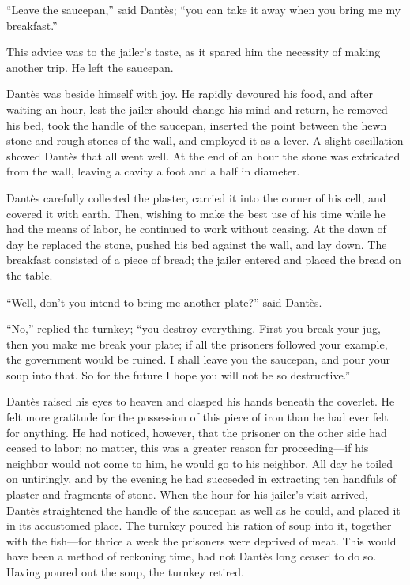“Leave the saucepan,” said Dantès; “you can take it away when you bring
me my breakfast.”

This advice was to the jailer’s taste, as it spared him the necessity
of making another trip. He left the saucepan.

Dantès was beside himself with joy. He rapidly devoured his food, and
after waiting an hour, lest the jailer should change his mind and
return, he removed his bed, took the handle of the saucepan, inserted
the point between the hewn stone and rough stones of the wall, and
employed it as a lever. A slight oscillation showed Dantès that all
went well. At the end of an hour the stone was extricated from the
wall, leaving a cavity a foot and a half in diameter.

Dantès carefully collected the plaster, carried it into the corner of
his cell, and covered it with earth. Then, wishing to make the best use
of his time while he had the means of labor, he continued to work
without ceasing. At the dawn of day he replaced the stone, pushed his
bed against the wall, and lay down. The breakfast consisted of a piece
of bread; the jailer entered and placed the bread on the table.

“Well, don’t you intend to bring me another plate?” said Dantès.

“No,” replied the turnkey; “you destroy everything. First you break
your jug, then you make me break your plate; if all the prisoners
followed your example, the government would be ruined. I shall leave
you the saucepan, and pour your soup into that. So for the future I
hope you will not be so destructive.”

Dantès raised his eyes to heaven and clasped his hands beneath the
coverlet. He felt more gratitude for the possession of this piece of
iron than he had ever felt for anything. He had noticed, however, that
the prisoner on the other side had ceased to labor; no matter, this was
a greater reason for proceeding—if his neighbor would not come to him,
he would go to his neighbor. All day he toiled on untiringly, and by
the evening he had succeeded in extracting ten handfuls of plaster and
fragments of stone. When the hour for his jailer’s visit arrived,
Dantès straightened the handle of the saucepan as well as he could, and
placed it in its accustomed place. The turnkey poured his ration of
soup into it, together with the fish—for thrice a week the prisoners
were deprived of meat. This would have been a method of reckoning time,
had not Dantès long ceased to do so. Having poured out the soup, the
turnkey retired.

